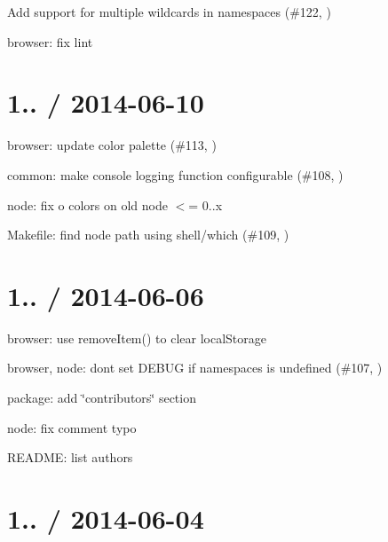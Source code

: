 \begin{DoxyItemize}
\item Add support for multiple wildcards in namespaces (\#122, )
\item browser\+: fix lint
\end{DoxyItemize}

\section*{1.. / 2014-\/06-\/10 }


\begin{DoxyItemize}
\item browser\+: update color palette (\#113, )
\item common\+: make console logging function configurable (\#108, )
\item node\+: fix o colors on old node $<$= 0..\+x
\item Makefile\+: find node path using shell/which (\#109, )
\end{DoxyItemize}

\section*{1.. / 2014-\/06-\/06 }


\begin{DoxyItemize}
\item browser\+: use {\ttfamily remove\+Item()} to clear local\+Storage
\item browser, node\+: don\textquotesingle{}t set D\+E\+B\+U\+G if namespaces is undefined (\#107, )
\item package\+: add \char`\"{}contributors\char`\"{} section
\item node\+: fix comment typo
\item R\+E\+A\+D\+M\+E\+: list authors
\end{DoxyItemize}

\section*{1.. / 2014-\/06-\/04 }


